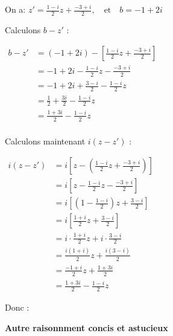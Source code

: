 \documentclass[12pt,a4paper]{article}
\begin{document}
\begin{enumerate}
\begin{enumerate}
        On a: \(         z' = \frac{1 - i}{2}z + \frac{-3 + i}{2}, \quad \text{et} \quad b = -1 + 2i \)

        Calculons \( b - z' \) :

        \(
        \begin{aligned}
            b - z' &= \left(-1 + 2i\right) - \left[\frac{1 - i}{2}z + \frac{-3 + i}{2}\right]\\
                  &= -1 + 2i - \frac{1 - i}{2}z - \frac{-3 + i}{2}\\
                  &= -1 + 2i + \frac{3 - i}{2} - \frac{1 - i}{2}z\\
                  &= \frac{1}{2} + \frac{3i}{2} - \frac{1 - i}{2}z\\
                  &= \frac{1+3i}{2} - \frac{1 - i}{2}z\\
        \end{aligned}
        \)

        Calculons maintenant \( i(z - z') \) :

        \(
        \begin{aligned}
            i(z - z') &= i\left[z - \left( \frac{1 - i}{2}z + \frac{-3 + i}{2} \right) \right]\\
                      &= i\left[z - \frac{1 - i}{2}z - \frac{-3 + i}{2} \right]\\
                      &=i\left[\left(1 - \frac{1 - i}{2} \right)z + \frac{3 - i}{2} \right]\\
                      &=i\left[ \frac{1 + i}{2}z + \frac{3 - i}{2} \right]\\
                      &=i \cdot \frac{1 + i}{2}z + i \cdot \frac{3 - i}{2}\\
                      &= \frac{i(1 + i)}{2}z + \frac{i(3 - i)}{2}\\
                      &= \frac{-1 + i}{2}z + \frac{1 + 3i}{2}\\
                      &= \frac{1 + 3i}{2} - \frac{1 - i}{2}z
        \end{aligned}
        \)
        
        Donc : 

        \textbf{Autre raisonnment concis et astucieux}


\end{enumerate}
\end{enumerate}
\end{document}

